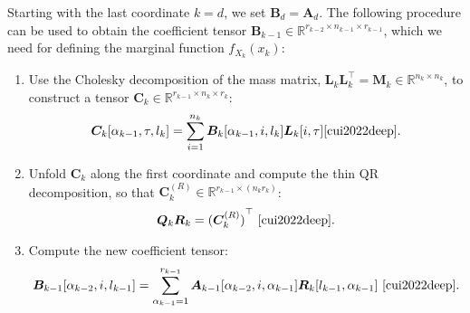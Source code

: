 \begin{prop}
	\label{prob:backMarg}
	Starting with the last coordinate $k = d$, we set $\bm{B}_d = \bm{A}_d$. The following procedure can be used to obtain the coefficient tensor $\bm{B}_{k-1} \in \mathbb{R}^{r_{k-2} \times n_{k-1} \times r_{k-1}}$, which we need for defining the marginal function $f_{X_k}(x_k)$:
	\begin{enumerate}
		\item Use the Cholesky decomposition of the mass matrix, $\bm{L}_k \bm{L}_k^\top = \bm{M}_k \in \mathbb{R}^{n_k \times n_k}$, to construct a tensor $\bm{C}_k \in \mathbb{R}^{r_{k-1} \times n_k \times r_k}$:
		\begin{equation}
			\bm{C}_k[\alpha_{k-1}, \tau, l_k] = \sum_{i=1}^{n_k} \bm{B}_k[\alpha_{k-1}, i, l_k] \bm{L}_k[i, \tau] \text{\cite[Eq. (27)]{cui2022deep}}.
		\end{equation}
		\item Unfold $\bm{C}_k$ along the first coordinate and compute the thin QR decomposition, so that $\bm{C}_k^{(R)} \in \mathbb{R}^{r_{k-1} \times (n_k r_k)}$:
		\begin{equation}
			\bm{Q}_k \bm{R}_k = {(\bm{C}_k^{(R)})}^{\top} \, \,  \text{\cite[Eq. 28]{cui2022deep}}.
		\end{equation}
		\item Compute the new coefficient tensor:
		\begin{equation}
			\bm{B}_{k-1}[\alpha_{k-2}, i, l_{k-1}] = \sum_{\alpha_{k-1}=1}^{r_{k-1}} \bm{A}_{k-1}[\alpha_{k-2}, i, \alpha_{k-1}] \bm{R}_k[l_{k-1}, \alpha_{k-1}]\, \,  \text{\cite[Eq. 29]{cui2022deep}}.
		\end{equation}
	\end{enumerate}
\end{prop}

